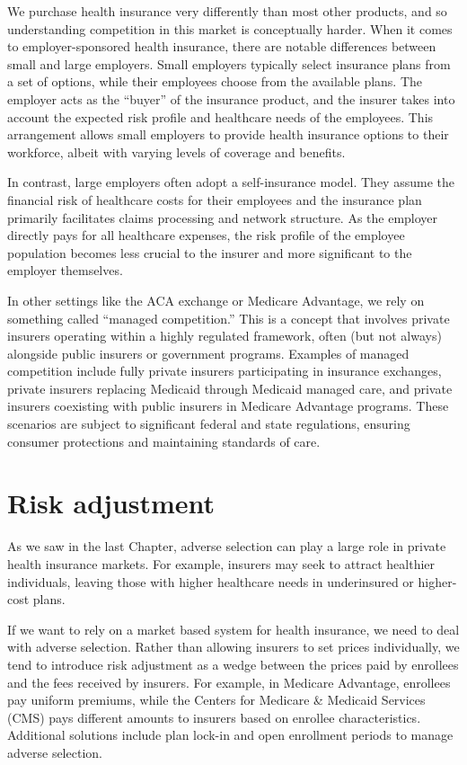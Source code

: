 \documentclass[
  letterpaper,
  DIV=11,
  numbers=noendperiod]{scrreport}
\theoremstyle{definition}
\theoremstyle{remark}
\begin{document}
We purchase health insurance very differently than most other products,
and so understanding competition in this market is conceptually harder.
When it comes to employer-sponsored health insurance, there are notable
differences between small and large employers. Small employers typically
select insurance plans from a set of options, while their employees
choose from the available plans. The employer acts as the ``buyer'' of
the insurance product, and the insurer takes into account the expected
risk profile and healthcare needs of the employees. This arrangement
allows small employers to provide health insurance options to their
workforce, albeit with varying levels of coverage and benefits.

In contrast, large employers often adopt a self-insurance model. They
assume the financial risk of healthcare costs for their employees and
the insurance plan primarily facilitates claims processing and network
structure. As the employer directly pays for all healthcare expenses,
the risk profile of the employee population becomes less crucial to the
insurer and more significant to the employer themselves.

In other settings like the ACA exchange or Medicare Advantage, we rely
on something called ``managed competition.'' This is a concept that
involves private insurers operating within a highly regulated framework,
often (but not always) alongside public insurers or government programs.
Examples of managed competition include fully private insurers
participating in insurance exchanges, private insurers replacing
Medicaid through Medicaid managed care, and private insurers coexisting
with public insurers in Medicare Advantage programs. These scenarios are
subject to significant federal and state regulations, ensuring consumer
protections and maintaining standards of care.

\hypertarget{risk-adjustment}{%
\section{Risk adjustment}\label{risk-adjustment}}

As we saw in the last Chapter, adverse selection can play a large role
in private health insurance markets. For example, insurers may seek to
attract healthier individuals, leaving those with higher healthcare
needs in underinsured or higher-cost plans.

If we want to rely on a market based system for health insurance, we
need to deal with adverse selection. Rather than allowing insurers to
set prices individually, we tend to introduce risk adjustment as a wedge
between the prices paid by enrollees and the fees received by insurers.
For example, in Medicare Advantage, enrollees pay uniform premiums,
while the Centers for Medicare \& Medicaid Services (CMS) pays different
amounts to insurers based on enrollee characteristics. Additional
solutions include plan lock-in and open enrollment periods to manage
adverse selection.
\end{document}
